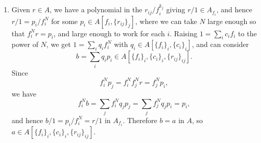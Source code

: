 \documentclass{report}
\begin{document}
\begin{enumerate}[label=\textbf{5.3.\Alph*.}]
	\item Given $r\in A$, we have a polynomial in the $r_{ij}/f_i^{k_j}$ giving
	      $r/1\in A_{f_i}$, and hence $r/1=p_i/f_i^N$ for some
	      $p_i\in A[f_i,\{r_{ij}\}_j]$, where we can take $N$ large enough so that
	      $f_i^Nr=p_i$, and large enough to work for each $i$. Raising
	      $1=\sum_ic_if_i$ to the power of $N$, we get $1=\sum_iq_if_i^N$ with
	      $q_i\in A[\{f_i\}_i,\{c_i\}_i]$, and can consider
	      \begin{equation*}
		      b=\sum_iq_ip_i\in A[\{f_i\}_i,\{c_i\}_i,\{r_{ij}\}_{ij}].
	      \end{equation*}
	      Since
	      \begin{equation*}
		      f_i^Np_j = f_i^Nf_j^Nr = f_j^Np_i,
	      \end{equation*}
	      we have
	      \begin{equation*}
		      f_i^Nb = \sum_jf_i^Nq_jp_j = \sum_jf_j^Nq_jp_i = p_i,
	      \end{equation*}
	      and hence $b/1=p_i/f_i^N=r/1$ in $A_{f_i}$. Therefore $b=a$ in $A$, so
	      $a\in A[\{f_i\}_i,\{c_i\}_i,\{r_{ij}\}_{ij}]$.
\end{enumerate}
\end{document}
